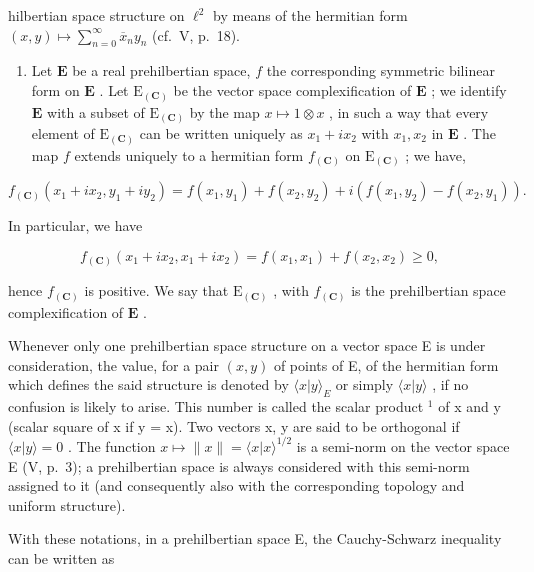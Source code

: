 hilbertian space structure on \(\ell^2\) by means of the hermitian form \((x, y) \mapsto \sum_{n=0}^{\infty} \overline{x}_n y_n\) (cf.~V, p.~18).

\begin{enumerate}
\def\labelenumi{\arabic{enumi})}
\setcounter{enumi}{4}
\tightlist
\item
  Let \(\mathbf{E}\) be a real prehilbertian space, \(f\) the corresponding symmetric bilinear form on \(\mathbf{E}\) . Let \(\mathrm{E}_{(\mathbf{C})}\) be the vector space complexification of \(\mathbf{E}\) ; we identify \(\mathbf{E}\) with a subset of \(\mathrm{E}_{(\mathbf{C})}\) by the map \(x \mapsto 1 \otimes x\) , in such a way that every element of \(\mathrm{E}_{(\mathbf{C})}\) can be written uniquely as \(x_1 + ix_2\) with \(x_1, x_2\) in \(\mathbf{E}\) . The map \(f\) extends uniquely to a hermitian form \(f_{(\mathbf{C})}\) on \(\mathrm{E}_{(\mathbf{C})}\) ; we have,
\end{enumerate}

\[
f _ {(\mathbf {C})} \left(x _ {1} + i x _ {2}, y _ {1} + i y _ {2}\right) = f \left(x _ {1}, y _ {1}\right) + f \left(x _ {2}, y _ {2}\right) + i \left(f \left(x _ {1}, y _ {2}\right) - f \left(x _ {2}, y _ {1}\right)\right).
\]

In particular, we have

\[
f _ {(\mathbf {C})} (x _ {1} + i x _ {2}, x _ {1} + i x _ {2}) = f (x _ {1}, x _ {1}) + f (x _ {2}, x _ {2}) \geqslant 0,
\]

hence \(f_{(\mathbf{C})}\) is positive. We say that \(\mathrm{E}_{(\mathbf{C})}\) , with \(f_{(\mathbf{C})}\) is the prehilbertian space complexification of \(\mathbf{E}\) .

Whenever only one prehilbertian space structure on a vector space E is under consideration, the value, for a pair \((x, y)\) of points of E, of the hermitian form which defines the said structure is denoted by \(\langle x|y\rangle_{E}\) or simply \(\langle x|y\rangle\) , if no confusion is likely to arise. This number is called the scalar product \(^{1}\) of x and y (scalar square of x if y = x). Two vectors x, y are said to be orthogonal if \(\langle x|y\rangle = 0\) . The function \(x \mapsto \|x\| = \langle x|x\rangle^{1/2}\) is a semi-norm on the vector space E (V, p.~3); a prehilbertian space is always considered with this semi-norm assigned to it (and consequently also with the corresponding topology and uniform structure).

With these notations, in a prehilbertian space E, the Cauchy-Schwarz inequality can be written as

